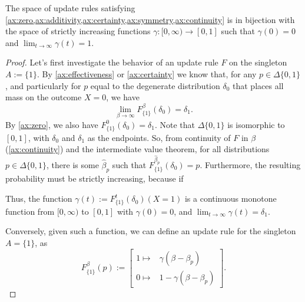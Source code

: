 \documentclass{article}
\begin{document}
\begin{claim}
The space of update rules satisfying
\cref{ax:zero,ax:additivity,ax:certainty,ax:symmetry,ax:continuity}
is in bijection with the space of strictly increasing functions
$\gamma : [0,\infty) \to [0,1]$
such that
$\gamma(0) = 0$ and $\lim_{t\to\infty}\gamma(t) = 1$.
\end{claim}
\begin{proof}
    Let's first investigate the behavior of an update rule $F$ on the singleton $A := \{1\}$.
    By \ref{ax:effectiveness} or \cref{ax:certainty} we know that, for any $p \in \Delta\{0,1\}$, and particularly for $p$ equal to the degenerate distribution $\delta_0$ that places all mass on the outcome $X=0$, we have
    \[
        \lim_{\beta \to \infty} F^\beta_{\{1\}}(\delta_0) = \delta_1.
    \]
    By \cref{ax:zero}, we also have $F^0_{\{1\}}(\delta_0) = \delta_1$. Note that $\Delta\{0,1\}$ is isomorphic to $[0,1]$, with $\delta_0$ and $\delta_1$ as the endpoints.  So, from continuity of $F$ in $\beta$ (\cref{ax:continuity}) and the intermediate value theorem, for all distributions $p \in \Delta\{0,1\}$, there is some $\hat\beta_p$ such that $F^{\hat\beta_p}_{\{1\}}(\delta_0) = p$.
    Furthermore, the resulting probability must be strictly increasing, because if

    Thus, the function $\gamma(t) := F^{t}_{\{1\}}(\delta_0)(X=1)$ is a continuous monotone function from $[0,\infty)$ to $[0,1]$ with $\gamma(0) = 0$,
    and $\lim_{t\to\infty} \gamma(t) = \delta_1$.


    Conversely, given such a function, we can define an update rule for the singleton $A = \{1\}$, as
    \[
        F^{\beta}_{\{1\}}(p) :=
        \begin{bmatrix}
            1 \mapsto& \gamma(\beta - \beta_p) \\
            0 \mapsto& 1-\gamma(\beta - \beta_p)
        \end{bmatrix}.
    \]
\end{proof}
\end{document}
